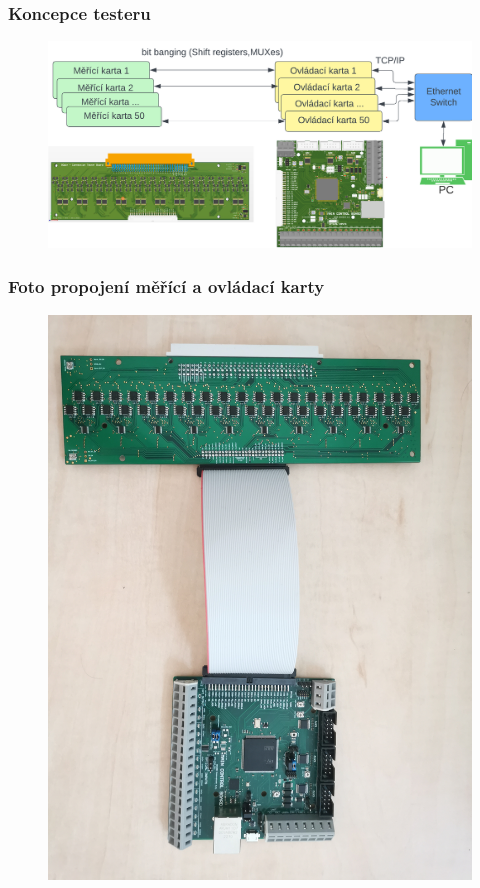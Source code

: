 \documentclass[%
  12pt,       				%
	t,                  %
	aspectratio=1610,   %
	unicode,						%
]{beamer}				    	%
\begin{document}
\begin{frame} 
	\frametitle{Koncepce testeru}
	\vspace*{0.5cm}
	\begin{figure}[ht!]
		\centering
		\includegraphics[width = \textwidth]{obrazky/system_karet_obh.png}
	\end{figure}
\end{frame}


\begin{frame} 
	\frametitle{Foto propojení měřící a ovládací karty}
	\begin{figure}[ht!]
		\centering
		\includegraphics[height = 0.7\textwidth, angle = 90]{obrazky/foto_obh.jpg}
	\end{figure}
\end{frame}
\end{document}

